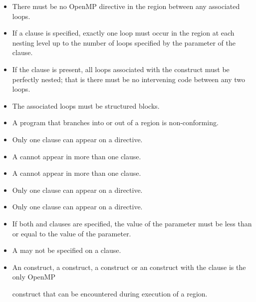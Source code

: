 \restrictions
\begin{itemize}
\item There must be no OpenMP directive in the region between any
associated loops.

\item If a  clause is specified, exactly one loop must
occur in the region at each nesting level up to the number of loops
specified by the parameter of the  clause.

\item If the  clause is present, all loops associated
with the construct must be perfectly nested; that is there must be
no intervening code between any two loops.

\item The associated loops must be structured blocks.

\item A program that branches into or out of a  region is non-conforming.

\item Only one  clause can appear on a  directive.

\item A  cannot appear in more than one  clause.

\item A  cannot appear in more than one  clause.

\item Only one  clause can appear on a  directive.

\item Only one  clause can appear on a  directive.

\item If both  and  clauses are specified, the value of the  parameter must be less than or equal to the value of the  parameter.

\item A  may not be specified on a  clause.

\item An  construct, a  construct, a  construct or an  construct with the  clause is the only OpenMP

construct that can be encountered during execution of a 
region.


\end{itemize}
